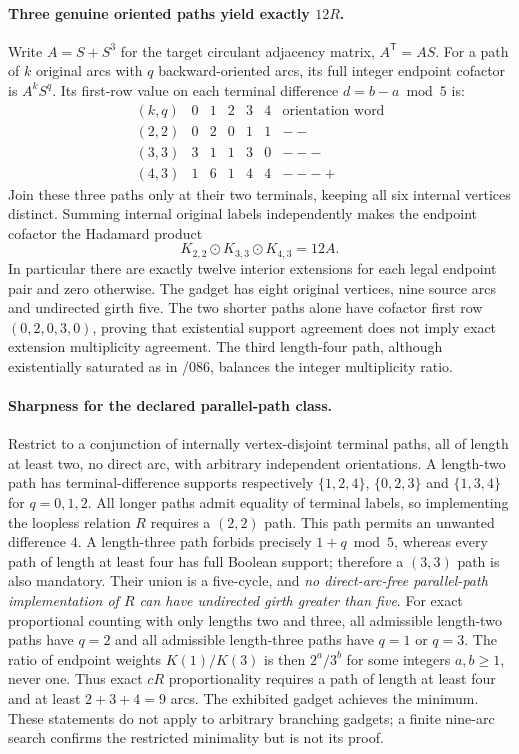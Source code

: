 \documentclass[11pt]{article}
\begin{document}
\paragraph{Three genuine oriented paths yield exactly $12R$.}
Write $A=S+S^3$ for the target circulant adjacency matrix,
$A^{\mathsf T}=AS$.
For a path of $k$ original arcs with $q$ backward-oriented
arcs, its full integer endpoint cofactor is $A^kS^q$.
Its first-row value on each terminal difference
$d=b-a\bmod5$ is:
\[
\begin{array}{c|rrrrr|l}
(k,q)&0&1&2&3&4&\text{orientation word}\\ \hline
(2,2)&0&2&0&1&1&--\\
(3,3)&3&1&1&3&0&---\\
(4,3)&1&6&1&4&4&---+
\end{array}
\]
Join these three paths only at their two terminals, keeping
all six internal vertices distinct.  Summing internal
original labels independently makes the endpoint cofactor
the Hadamard product
\[
\boxed{K_{2,2}\odot K_{3,3}\odot K_{4,3}=12A.}
\]
In particular there are exactly twelve interior extensions
for each legal endpoint pair and zero otherwise. The
gadget has eight original vertices, nine source arcs and
undirected girth five. The two shorter paths alone have
cofactor first row $(0,2,0,3,0)$, proving that
existential support agreement does not imply exact
extension multiplicity agreement. The third length-four
path, although existentially saturated as in /086,
balances the integer multiplicity ratio.

\paragraph{Sharpness for the declared parallel-path class.}
Restrict to a conjunction of internally vertex-disjoint
terminal paths, all of length at least two, no direct arc,
with arbitrary independent orientations. A length-two
path has terminal-difference supports respectively
$\{1,2,4\}$, $\{0,2,3\}$ and $\{1,3,4\}$
for $q=0,1,2$. All longer paths admit equality of
terminal labels, so implementing the loopless relation
$R$ requires a $(2,2)$ path. This path permits an unwanted
difference $4$. A length-three path forbids precisely
$1+q\bmod5$, whereas every path of length at least four
has full Boolean support; therefore a $(3,3)$ path
is also mandatory. Their union is a five-cycle, and
\emph{no direct-arc-free parallel-path implementation of
$R$ can have undirected girth greater than five}.
For exact proportional counting with only lengths
two and three, all admissible length-two paths have
$q=2$ and all admissible length-three paths have
$q=1$ or $q=3$. The ratio of endpoint weights
$K(1)/K(3)$ is then $2^a/3^b$ for some integers
$a,b\ge1$, never one. Thus exact $cR$ proportionality
requires a path of length at least four and at least
$2+3+4=9$ arcs. The exhibited gadget achieves the
minimum. These statements do not apply to arbitrary
branching gadgets; a finite nine-arc search confirms
the restricted minimality but is not its proof.
\end{document}

